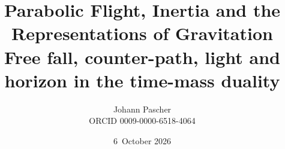 \documentclass[11pt,a4paper]{report}
\title{Parabolic Flight, Inertia and the Representations of Gravitation\\[0.5em]
  \large Free fall, counter-path, light and horizon in the time-mass duality}
\date{6~October 2026}
\author{Johann Pascher\\\small ORCID 0009-0000-6518-4064}
\begin{document}
\renewcommand{\thechapter}{}
\renewcommand{\thesection}{\arabic{section}}
\maketitle
\tableofcontents

\end{document}
